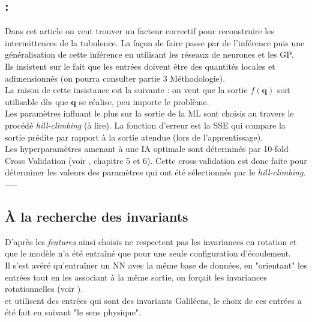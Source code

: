 \documentclass[a4paper,12pt]{report}
\numberwithin{equation}{section} %
\begin{document}
\pagebreak

\subsection*{\textbf{\cite{duraisamy2015new}} : }
Dans cet article on veut trouver un facteur correctif pour reconstruire les intermittences de la tubulence. La façon de faire passe par de l'inférence puis une généralisation de cette inférence en utilisant les réseaux de neurones et les GP.\\
Ils insistent sur le fait que les entrées doivent être des quantités locales et adimensionnés (on pourra consulter \cite{tracey2015machine} partie 3 Méthodologie).\\
La raison de cette insistance est la suivante : on veut que la sortie $f(\textbf{q})$ soit utilisable dès que $\textbf{q}$ se réalise, peu importe le problème.\\

\noindent Les paramètres influant le plus sur la sortie de la ML sont choisis au travers le procédé \textit{hill-climbing} \cite{kohavi1997wrappers} (à lire). La fonction d'erreur est la SSE qui compare la sortie prédite par rapport à la sortie atendue (lors de l'apprentissage).\\
Les hyperparamètres amenant à une IA optimale sont déterminés par 10-fold Cross Validation (voir \cite{muller2016introduction}, chapitre 5 et 6). Cette cross-validation est donc faite pour déterminer les valeurs des paramètres qui ont été sélectionnés par le \textit{hill-climbing}.\\
-----\\[0.5cm]

\subsection*{À la recherche des invariants}
\noindent D'après \citep{ling2016machine} les \textit{features} ainsi choisis ne respectent pas les invariances en rotation et que le modèle n'a été entraîné que pour une seule configuration d'écoulement.\\
Il s'est avéré qu'entraîner un NN avec la même base de données, en "orientant" les entrées tout en les associant à la même sortie, on forçait les invariances rotationnelles (voir \cite{LEFIK20033265}).\\

\noindent \cite{tracey2013application} et \cite{ling2015evaluation} utilisent des entrées qui sont des invariants Galiléens, le choix de ces entrées a été fait en suivant "le sens physique".
\end{document}
